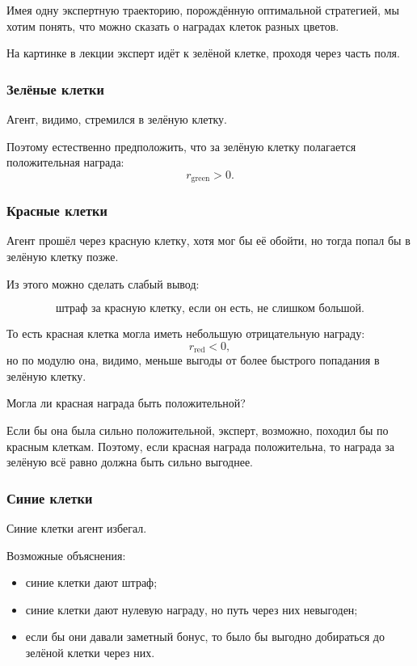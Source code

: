 \documentclass[12pt,a4paper]{article}
\begin{document}
Имея одну экспертную траекторию, порождённую оптимальной стратегией, мы хотим понять, что можно сказать о наградах клеток разных цветов.

На картинке в лекции эксперт идёт к зелёной клетке, проходя через часть поля.

\subsubsection{Зелёные клетки}

Агент, видимо, стремился в зелёную клетку.

Поэтому естественно предположить, что за зелёную клетку полагается положительная награда:
\[
r_{\mathrm{green}}>0.
\]

\subsubsection{Красные клетки}

Агент прошёл через красную клетку, хотя мог бы её обойти, но тогда попал бы в зелёную клетку позже.

Из этого можно сделать слабый вывод:

\[
\text{штраф за красную клетку, если он есть, не слишком большой.}
\]

То есть красная клетка могла иметь небольшую отрицательную награду:
\[
r_{\mathrm{red}}<0,
\]
но по модулю она, видимо, меньше выгоды от более быстрого попадания в зелёную клетку.

Могла ли красная награда быть положительной?

Если бы она была сильно положительной, эксперт, возможно, походил бы по красным клеткам. Поэтому, если красная награда положительна, то награда за зелёную всё равно должна быть сильно выгоднее.

\subsubsection{Синие клетки}

Синие клетки агент избегал.

Возможные объяснения:
\begin{itemize}
    \item синие клетки дают штраф;
    \item синие клетки дают нулевую награду, но путь через них невыгоден;
    \item если бы они давали заметный бонус, то было бы выгодно добираться до зелёной клетки через них.
\end{itemize}
\end{document}
